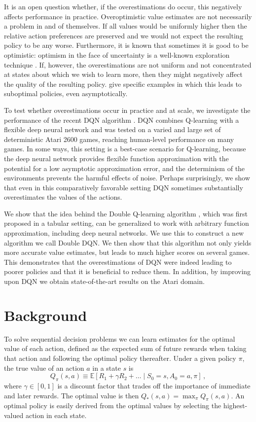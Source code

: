 \documentclass[letterpaper]{article}
\def\E#1{\mathbb{E}\left[#1\right]}
\def\g{\gamma}
\begin{document}
It is an open question whether, if the overestimations do occur, this negatively affects performance in practice. Overoptimistic value estimates are not necessarily a problem in and of themselves.  If all values would be uniformly higher then the relative action preferences are preserved and we would not expect the resulting policy to be any worse.  Furthermore, it is known that sometimes it is good to be optimistic: optimism in the face of uncertainty is a well-known exploration technique \citep{Kaelbling:1996}.  If, however, the overestimations are not uniform and not concentrated at states about which we wish to learn more, then they might negatively affect the quality of the resulting policy.  \citet{Thrun:1993} give specific examples in which this leads to suboptimal policies, even asymptotically.

To test whether overestimations occur in practice and at scale, we investigate the performance of the recent DQN algorithm \citep{Mnih:2015}.  DQN combines Q-learning with a flexible deep neural network and was tested on a varied and large set of deterministic Atari 2600 games, reaching human-level performance on many games.  In some ways, this setting is a best-case scenario for Q-learning, because the deep neural network provides flexible function approximation with the potential for a low asymptotic approximation error, and the determinism of the environments prevents the harmful effects of noise.
Perhaps surprisingly, we show that even in this comparatively favorable setting DQN sometimes substantially overestimates the values of the actions.

We show that the idea behind the Double Q-learning algorithm \citep{vanHasselt:2010}, which was first proposed in a tabular setting, can be generalized to work with arbitrary function approximation, including deep neural networks.  We use this to construct a new algorithm we call Double DQN.  We then show that this algorithm not only yields more accurate value estimates, but leads to much higher scores on several games.  This demonstrates that the overestimations of DQN were indeed leading to poorer policies and that it is beneficial to reduce them.  In addition, by improving upon DQN we obtain state-of-the-art results on the Atari domain.


\section{Background}
\label{sec:qoveropt}


To solve sequential decision problems we can learn estimates for the optimal value of each action, defined as the expected sum of future rewards
when taking that action and following the optimal policy thereafter.  Under a given policy $\pi$, the true value of an action $a$ in a state $s$ is
\[
Q_{\pi}(s,a) \equiv \E{ R_1 + \g R_2 + \ldots \mid S_0 = s, A_0 = a, \pi } \,,
\]
where $\g \in [0,1]$ is a discount factor that trades off the importance of immediate and later rewards.
The optimal value is then $Q_*(s,a) = \max_{\pi} Q_{\pi}(s,a)$. An optimal policy is easily derived from the optimal values by selecting the highest-valued action in each state.
\end{document}
